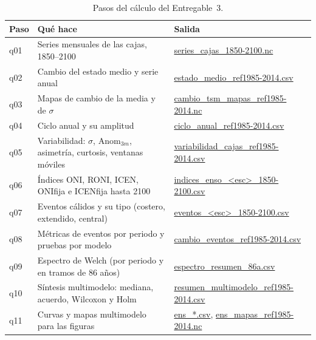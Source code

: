 \documentclass[11pt,a4paper]{article}
\newcommand{\archivo}[1]{\begingroup\hypersetup{urlcolor=black}\url{#1}\endgroup}
\begin{document}
\begin{table}[htbp]
\caption{Pasos del cálculo del Entregable~3.}
\label{tab:scripts}
\centering
\footnotesize
\begin{tabular}{@{}lL{4.4cm}L{\dimexpr\textwidth-4.4cm-1.2cm-4\tabcolsep\relax}@{}}
\toprule
\textbf{Paso} & \textbf{Qué hace} & \textbf{Salida} \\
\midrule
q01 & Series mensuales de las cajas, 1850--2100 & \archivo{series_cajas_1850-2100.nc} \\
q02 & Cambio del estado medio y serie anual & \archivo{estado_medio_ref1985-2014.csv} \\
q03 & Mapas de cambio de la media y de $\sigma$ & \archivo{cambio_tsm_mapas_ref1985-2014.nc} \\
q04 & Ciclo anual y su amplitud & \archivo{ciclo_anual_ref1985-2014.csv} \\
q05 & Variabilidad: $\sigma$, $\mathrm{Anom}_{3m}$, asimetría, curtosis, ventanas móviles & \archivo{variabilidad_cajas_ref1985-2014.csv} \\
q06 & Índices ONI, RONI, ICEN, ONIfija e ICENfija hasta 2100 & \archivo{indices_enso_<esc>_1850-2100.csv} \\
q07 & Eventos cálidos y su tipo (costero, extendido, central) & \archivo{eventos_<esc>_1850-2100.csv} \\
q08 & Métricas de eventos por periodo y pruebas por modelo & \archivo{cambio_eventos_ref1985-2014.csv} \\
q09 & Espectro de Welch (por periodo y en tramos de 86 años) & \archivo{espectro_resumen_86a.csv} \\
q10 & Síntesis multimodelo: mediana, acuerdo, Wilcoxon y Holm & \archivo{resumen_multimodelo_ref1985-2014.csv} \\
q11 & Curvas y mapas multimodelo para las figuras & \archivo{ens_*.csv}, \archivo{ens_mapas_ref1985-2014.nc} \\
\bottomrule
\end{tabular}
\end{table}
\end{document}
